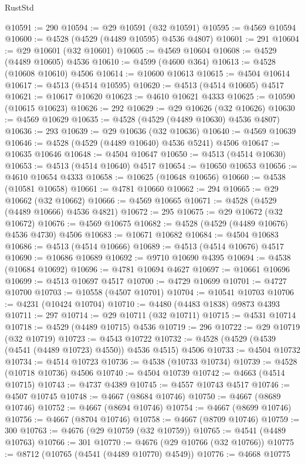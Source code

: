\begin{lexlean}{RustStd}
\begin{coremodule}
@10591 := 290
@10594 := @29 @10591 (@32 @10591)
@10595 := @4569 @10594
@10600 := @4528 (@4529 (@4489 @10595) @4536 @4807)
@10601 := 291
@10604 := @29 @10601 (@32 @10601)
@10605 := @4569 @10604
@10608 := @4529 (@4489 @10605) @4536
@10610 := @4599 (@4600 @364)
@10613 := @4528 (@10608 @10610) @4506
@10614 := @10600 @10613
@10615 := @4504 @10614
@10617 := @4513 (@4514 @10595)
@10620 := @4513 (@4514 @10605) @4517
@10621 := @10617 @10620
@10623 := @4610 @10621 @4333
@10625 := @10590 (@10615 @10623)
@10626 := 292
@10629 := @29 @10626 (@32 @10626)
@10630 := @4569 @10629
@10635 := @4528 (@4529 (@4489 @10630) @4536 @4807)
@10636 := 293
@10639 := @29 @10636 (@32 @10636)
@10640 := @4569 @10639
@10646 := @4528 (@4529 (@4489 @10640) @4536 @5241) @4506
@10647 := @10635 @10646
@10648 := @4504 @10647
@10650 := @4513 (@4514 @10630)
@10653 := @4513 (@4514 @10640) @4517
@10654 := @10650 @10653
@10656 := @4610 @10654 @4333
@10658 := @10625 (@10648 @10656)
@10660 := @4538 (@10581 @10658)
@10661 := @4781 @10660
@10662 := 294
@10665 := @29 @10662 (@32 @10662)
@10666 := @4569 @10665
@10671 := @4528 (@4529 (@4489 @10666) @4536 @4821)
@10672 := 295
@10675 := @29 @10672 (@32 @10672)
@10676 := @4569 @10675
@10682 := @4528 (@4529 (@4489 @10676) @4536 @4730) @4506
@10683 := @10671 @10682
@10684 := @4504 @10683
@10686 := @4513 (@4514 @10666)
@10689 := @4513 (@4514 @10676) @4517
@10690 := @10686 @10689
@10692 := @9710 @10690 @4395
@10694 := @4538 (@10684 @10692)
@10696 := @4781 @10694 @4627
@10697 := @10661 @10696
@10699 := @4513 @10697 @4517
@10700 := @4729 @10699
@10701 := @4727 @10700
@10703 := @10558 (@4507 @10701)
@10704 := @10541 @10703
@10706 := @4231 (@10424 @10704)
@10710 := @4480 (@4483 @1838) @9873 @4393
@10711 := 297
@10714 := @29 @10711 (@32 @10711)
@10715 := @4531 @10714
@10718 := @4529 (@4489 @10715) @4536
@10719 := 296
@10722 := @29 @10719 (@32 @10719)
@10723 := @4543 @10722
@10732 := @4528 (@4529 (@4539 (@4541 (@4489 @10723) @4550)) @4536 @4515) @4506
@10733 := @4504 @10732
@10734 := @4514 @10723
@10736 := @4538 (@10733 @10734)
@10739 := @4528 (@10718 @10736) @4506
@10740 := @4504 @10739
@10742 := @4663 (@4514 @10715)
@10743 := @4737 @4389
@10745 := @4557 @10743 @4517
@10746 := @4507 @10745
@10748 := @4667 (@8684 @10746)
@10750 := @4667 (@8689 @10746)
@10752 := @4667 (@8694 @10746)
@10754 := @4667 (@8699 @10746)
@10756 := @4667 (@8704 @10746)
@10758 := @4667 (@8709 @10746)
@10759 := 300
@10763 := @4676 (@29 @10759 (@32 @10759))
@10765 := @4541 (@4489 @10763)
@10766 := 301
@10770 := @4676 (@29 @10766 (@32 @10766))
@10775 := @8712 (@10765 (@4541 (@4489 @10770) @4549))
@10776 := @4668 @10775

\end{coremodule}
\end{lexlean}
